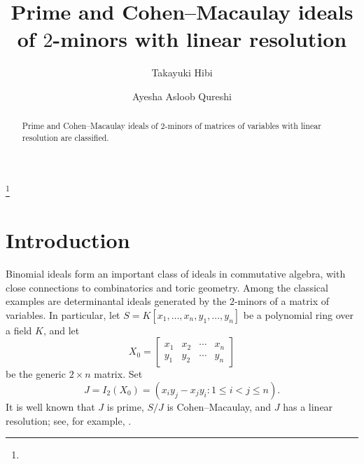 \documentclass[12pt]{amsart}
\begin{document}
   
        \title[ideals of $2$-minors]{Prime and Cohen--Macaulay ideals of $2$-minors with linear resolution}
	
\author[T.~Hibi]{Takayuki Hibi}
\address[Takayuki Hibi]
{Department of Pure and Applied Mathematics, 
Graduate School of Information Science and Technology, 
Osaka University, 
Suita, Osaka 565-0871, Japan}

\author[A. A. Qureshi]{Ayesha Asloob Qureshi}      
   \address[Ayesha Asloob Qureshi]{Sabanci University, Faculty of Engineering and Natural Sciences, Orta Mahalle, Tuzla 34956, Istanbul, Turkey}	

       
	
    
	\thanks{} 

        \maketitle
      
\begin{abstract}
Prime and Cohen--Macaulay ideals of $2$-minors of matrices of variables with linear resolution are classified.
\end{abstract}







\section*{Introduction}
Binomial ideals form an important class of ideals in commutative algebra,
with close connections to combinatorics and toric geometry. Among the
classical examples are determinantal ideals generated by the $2$-minors
of a matrix of variables. In particular, let
$S=K[x_1,\ldots,x_n,y_1,\ldots,y_n]$ be a polynomial ring over a field
$K$, and let
\[
X_0=
\begin{bmatrix}
x_1 & x_2 & \cdots & x_n\\
y_1 & y_2 & \cdots & y_n
\end{bmatrix}
\]
be the generic $2\times n$ matrix. Set
\[
J=I_2(X_0)
  =(x_i y_j-x_jy_i:1\leq i<j\leq n).
\]
It is well known that $J$ is prime, $S/J$ is Cohen--Macaulay, and $J$
has a linear resolution; see, for example, \cite{BrunsVetter}.
\end{document}
